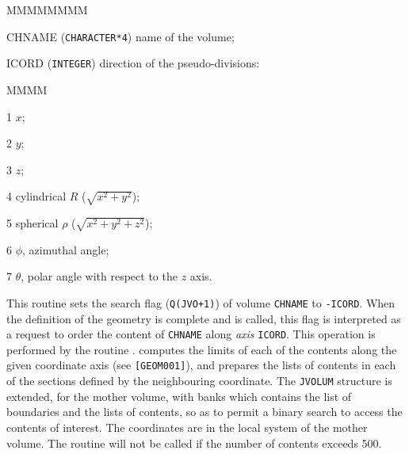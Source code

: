           
          


\begin{DLtt}{MMMMMMMM}
\item[CHNAME]  ({\tt CHARACTER*4}) name of the volume;
\item[ICORD]  ({\tt INTEGER}) direction of the pseudo-divisions:
\begin{DLtt}{MMMM}
\item[1] $x$;
\item[2] $y$;
\item[3] $z$;
\item[4] cylindrical $R$ ($\sqrt{x^2+y^2}$);
\item[5] spherical $\rho$ ($\sqrt{x^2+y^2+z^2}$);
\item[6] $\phi$, azimuthal angle;
\item[7] $\theta$, polar angle with respect to the $z$ axis.
\end{DLtt}
\end{DLtt}

This routine sets the search flag ({\tt Q(JVO+1)}) of volume {\tt CHNAME} 
to {\tt -ICORD}. When the definition of the geometry is complete and 
 is called, this flag is interpreted as a request to order 
the content
of {\tt CHNAME} along {\it axis} {\tt ICORD}. This operation is 
performed by the routine .
 computes the limits of each of the contents along the given
coordinate axis (see {\tt [GEOM001]}),
and prepares the lists of contents in each of the sections
defined by the neighbouring coordinate. The {\tt JVOLUM} structure 
is extended, for
the mother volume, with banks which contains the list of boundaries and the
lists of contents, so as to permit a binary search to access the contents
of interest. The coordinates are in the local system of the mother volume.
The routine  will not be called if the number of contents 
exceeds 500.

